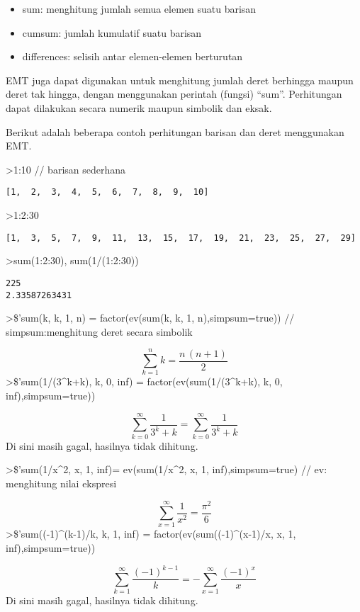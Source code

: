 \documentclass[
]{book}
\begin{document}
\begin{itemize}
\item
  sum: menghitung jumlah semua elemen suatu barisan
\item
  cumsum: jumlah kumulatif suatu barisan
\item
  differences: selisih antar elemen-elemen berturutan
\end{itemize}

EMT juga dapat digunakan untuk menghitung jumlah deret berhingga maupun deret tak hingga, dengan menggunakan perintah (fungsi) ``sum''. Perhitungan dapat dilakukan secara numerik maupun simbolik dan eksak.

Berikut adalah beberapa contoh perhitungan barisan dan deret menggunakan EMT.

\textgreater1:10 // barisan sederhana

\begin{verbatim}
[1,  2,  3,  4,  5,  6,  7,  8,  9,  10]
\end{verbatim}

\textgreater1:2:30

\begin{verbatim}
[1,  3,  5,  7,  9,  11,  13,  15,  17,  19,  21,  23,  25,  27,  29]
\end{verbatim}

\textgreater sum(1:2:30), sum(1/(1:2:30))

\begin{verbatim}
225
2.33587263431
\end{verbatim}

\textgreater\$'sum(k, k, 1, n) = factor(ev(sum(k, k, 1, n),simpsum=true)) // simpsum:menghitung deret secara simbolik

\[\sum_{k=1}^{n}{k}=\frac{n\,\left(n+1\right)}{2}\]\textgreater\$'sum(1/(3\^{}k+k), k, 0, inf) = factor(ev(sum(1/(3\^{}k+k), k, 0, inf),simpsum=true))

\[\sum_{k=0}^{\infty }{\frac{1}{3^{k}+k}}=\sum_{k=0}^{\infty }{\frac{
 1}{3^{k}+k}}\]Di sini masih gagal, hasilnya tidak dihitung.

\textgreater\$'sum(1/x\^{}2, x, 1, inf)= ev(sum(1/x\^{}2, x, 1, inf),simpsum=true) // ev: menghitung nilai ekspresi

\[\sum_{x=1}^{\infty }{\frac{1}{x^2}}=\frac{\pi^2}{6}\]\textgreater\$'sum((-1)\^{}(k-1)/k, k, 1, inf) = factor(ev(sum((-1)\^{}(x-1)/x, x, 1, inf),simpsum=true))

\[\sum_{k=1}^{\infty }{\frac{\left(-1\right)^{k-1}}{k}}=-\sum_{x=1}^{
 \infty }{\frac{\left(-1\right)^{x}}{x}}\]Di sini masih gagal, hasilnya tidak dihitung.
\end{document}
